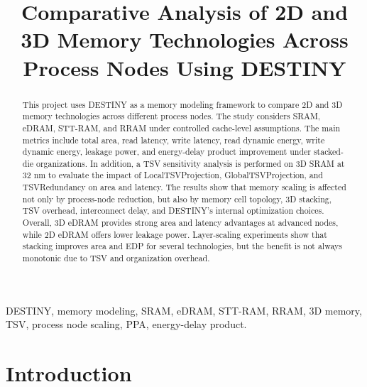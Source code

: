 \documentclass[conference]{IEEEtran}
\begin{document}
\title{Comparative Analysis of 2D and 3D Memory Technologies Across Process Nodes Using DESTINY}

\author{
}

\maketitle

\begin{abstract}
This project uses DESTINY as a memory modeling framework to compare 2D and 3D memory technologies across different process nodes. The study considers SRAM, eDRAM, STT-RAM, and RRAM under controlled cache-level assumptions. The main metrics include total area, read latency, write latency, read dynamic energy, write dynamic energy, leakage power, and energy-delay product improvement under stacked-die organizations. In addition, a TSV sensitivity analysis is performed on 3D SRAM at 32 nm to evaluate the impact of LocalTSVProjection, GlobalTSVProjection, and TSVRedundancy on area and latency. The results show that memory scaling is affected not only by process-node reduction, but also by memory cell topology, 3D stacking, TSV overhead, interconnect delay, and DESTINY's internal optimization choices. Overall, 3D eDRAM provides strong area and latency advantages at advanced nodes, while 2D eDRAM offers lower leakage power. Layer-scaling experiments show that stacking improves area and EDP for several technologies, but the benefit is not always monotonic due to TSV and organization overhead.
\end{abstract}

\begin{IEEEkeywords}
DESTINY, memory modeling, SRAM, eDRAM, STT-RAM, RRAM, 3D memory, TSV, process node scaling, PPA, energy-delay product.
\end{IEEEkeywords}

\section{Introduction}
\end{document}
